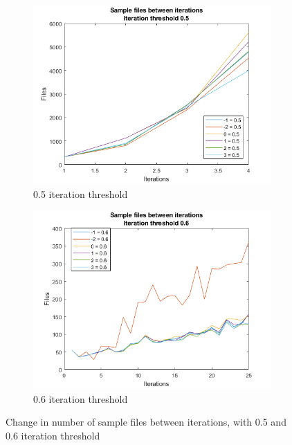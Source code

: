 \begin{figure}
    \centering
    \begin{subfigure}[b]{.49\textwidth}
        \centering
        \includegraphics[width=\textwidth]{figures/iterfiles-0.5.png}
        \caption{0.5 iteration threshold}
        \label{sfig:iter:iterfiles0.5}
    \end{subfigure}
    \hfill
    \begin{subfigure}[b]{.49\textwidth}
        \centering
        \includegraphics[width=\textwidth]{figures/iterfiles-0.6.png}
        \caption{0.6 iteration threshold}
        \label{sfig:iter:iterfiles0.6}
    \end{subfigure}
    \caption{Change in number of sample files between iterations, with 0.5 and 0.6 iteration threshold}
    \label{fig:iter:iterfiles0.50.6}
\end{figure}

